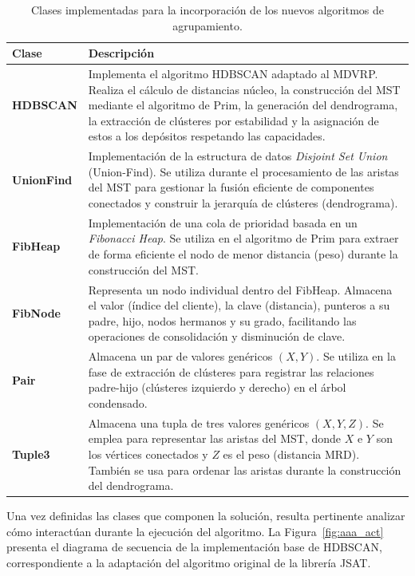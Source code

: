 \begin{table}[H]
\centering
\caption{Clases implementadas para la incorporaci\'on de los nuevos algoritmos de agrupamiento.}
\label{tab:clases}
\small
\begin{tabular}{@{}lp{10cm}@{}}
\toprule
\textbf{Clase} & \textbf{Descripci\'on} \\
\midrule
\textbf{HDBSCAN} & Implementa el algoritmo HDBSCAN adaptado al MDVRP. Realiza el cálculo de distancias núcleo, la construcción del MST mediante el algoritmo de Prim, la generación del dendrograma, la extracción de clústeres por estabilidad y la asignación de estos a los depósitos respetando las capacidades. \\
\textbf{UnionFind} & Implementación de la estructura de datos \textit{Disjoint Set Union} (Union-Find). Se utiliza durante el procesamiento de las aristas del MST para gestionar la fusión eficiente de componentes conectados y construir la jerarquía de clústeres (dendrograma). \\
\textbf{FibHeap} & Implementación de una cola de prioridad basada en un \textit{Fibonacci Heap}. Se utiliza en el algoritmo de Prim para extraer de forma eficiente el nodo de menor distancia (peso) durante la construcción del MST. \\
\textbf{FibNode} & Representa un nodo individual dentro del FibHeap. Almacena el valor (índice del cliente), la clave (distancia), punteros a su padre, hijo, nodos hermanos y su grado, facilitando las operaciones de consolidación y disminución de clave. \\
\textbf{Pair} & Almacena un par de valores genéricos \((X, Y)\). Se utiliza en la fase de extracción de clústeres para registrar las relaciones padre-hijo (clústeres izquierdo y derecho) en el árbol condensado. \\
\textbf{Tuple3} & Almacena una tupla de tres valores genéricos \((X, Y, Z)\). Se emplea para representar las aristas del MST, donde \(X\) e \(Y\) son los vértices conectados y \(Z\) es el peso (distancia MRD). También se usa para ordenar las aristas durante la construcción del dendrograma. \\
\bottomrule
\end{tabular}
\end{table}

Una vez definidas las clases que componen la solución, resulta pertinente analizar cómo interactúan durante la ejecución del algoritmo. La Figura~\ref{fig:aaa_act} presenta el diagrama de secuencia de la implementación base de HDBSCAN, correspondiente a la adaptación del algoritmo original de la librería JSAT. 

